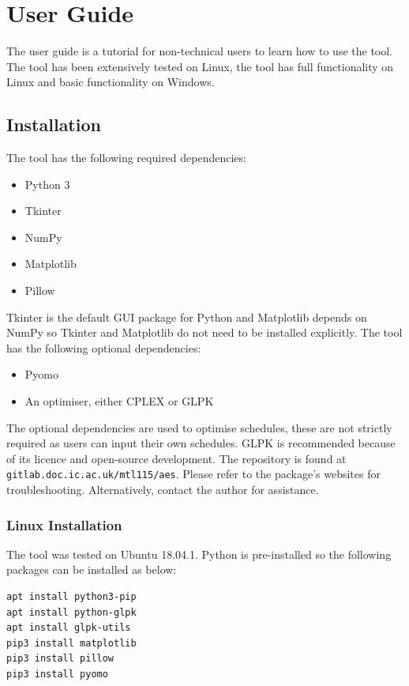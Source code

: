 \chapter{User Guide}

The user guide is a tutorial for non-technical users to learn how to use the tool. The tool has been extensively tested on Linux, the tool has full functionality on Linux and basic functionality on Windows.

\section{Installation}

The tool has the following required dependencies:

\begin{itemize}
	\item Python 3
	\item Tkinter
	\item NumPy
	\item Matplotlib
	\item Pillow
\end{itemize}

Tkinter is the default GUI package for Python and Matplotlib depends on NumPy so Tkinter and Matplotlib do not need to be installed explicitly. The tool has the following optional dependencies:

\begin{itemize}
	\item Pyomo
	\item An optimiser, either CPLEX or GLPK
\end{itemize}

The optional dependencies are used to optimise schedules, these are not strictly required as users can input their own schedules. GLPK is recommended because of its licence and open-source development. The repository is found at \texttt{gitlab.doc.ic.ac.uk/mtl115/aes}. Please refer to the package's websites for troubleshooting. Alternatively, contact the author for assistance.

\subsection{Linux Installation}

The tool was tested on Ubuntu 18.04.1. Python is pre-installed so the following packages can be installed as below:
\begin{verbatim}
apt install python3-pip
apt install python-glpk
apt install glpk-utils
pip3 install matplotlib
pip3 install pillow
pip3 install pyomo
\end{verbatim}

